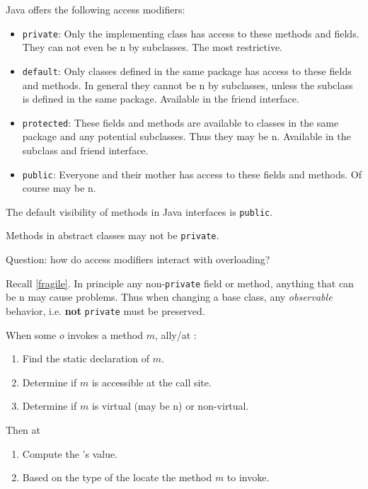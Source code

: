 \documentclass{article}
\begin{document}
Java offers the following access modifiers:
\begin{itemize}
\item \texttt{private}: Only the implementing class has access to these methods and fields. They can not even be \override{}n by subclasses. The most restrictive.
\item \texttt{default}: Only classes defined in the same package has access to these fields and methods. In general they cannot be \override{}n by subclasses, unless the subclass is defined in the same package. Available in the friend interface.
\item \texttt{protected}: These fields and methods are available to classes in the same package and any potential subclasses. Thus they may be \override{}n.  Available in the subclass and friend interface.
\item \texttt{public}: Everyone and their mother has access to these fields and methods. Of course may be \override{}n.
\end{itemize}

\begin{remark}
  The default visibility of methods in Java interfaces is \texttt{public}.
\end{remark}

\begin{remark}
  Methods in abstract classes may not be \texttt{private}.
\end{remark}

Question: how do access modifiers interact with overloading?

Recall \ref{fragile}. In principle any non-\texttt{private} field or method, anything that can be \override{}n may cause problems. Thus when changing a base class, any \textit{observable} behavior, i.e. \textbf{not} \texttt{private} must be preserved.

\begin{definition}
\label{jls1}
When some \receiver{} $o$ invokes a method $m$, \static{}ally/at \compiletime{}:
\begin{enumerate}
\item Find the static declaration of $m$.
\item Determine if $m$ is accessible at the call site.
\item Determine if $m$ is virtual (may be \override{}n) or non-virtual.
\end{enumerate}
Then at \runtime{}
\begin{enumerate}
\item Compute the \receiver{}'s value.
\item Based on the \dynamic{} type of the \receiver{} locate the method $m$ to invoke.
\end{enumerate}
\end{definition}
\end{document}
